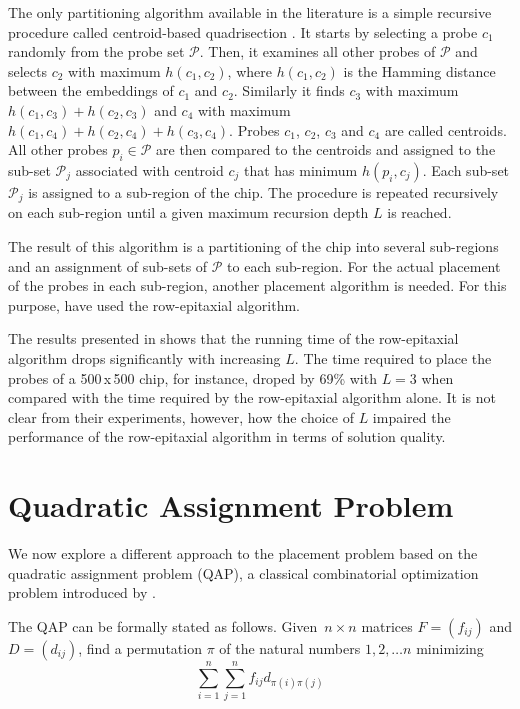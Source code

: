 \documentclass{bioinfo}
\begin{document}
The only partitioning algorithm available in the literature is a simple recursive procedure called centroid-based quadrisection \citep{KAHNG03_1}. It starts by selecting a probe $c_1$ randomly from the probe set $\mathcal{P}$. Then, it examines all other probes of $\mathcal{P}$ and selects $c_2$ with maximum $h(c_1,c_2)$, where $h(c_1,c_2)$ is the Hamming distance between the embeddings of $c_1$ and $c_2$. Similarly it finds $c_3$ with maximum $h(c_1,c_3) + h(c_2,c_3)$ and $c_4$ with maximum $h(c_1,c_4) + h(c_2,c_4) + h(c_3,c_4)$. Probes $c_1$, $c_2$, $c_3$ and $c_4$ are called centroids. All other probes $p_i \in \mathcal{P}$ are then compared to the centroids and assigned to the sub-set $\mathcal{P}_j$ associated with centroid $c_j$ that has minimum $h(p_i,c_j)$. Each sub-set $\mathcal{P}_j$ is assigned to a sub-region of the chip. The procedure is repeated recursively on each sub-region until a given maximum recursion depth $L$ is reached.

The result of this algorithm is a partitioning of the chip into several sub-regions and an assignment of sub-sets of $\mathcal{P}$ to each sub-region. For the actual placement of the probes in each sub-region, another placement algorithm is needed. For this purpose, \citealp{KAHNG03_1} have used the row-epitaxial algorithm.

The results presented in \citealp{KAHNG03_1} shows that the running time of the row-epitaxial algorithm drops significantly with increasing $L$. The time required to place the probes of a 500\,x\,500 chip, for instance, droped by 69\% with $L = 3$ when compared with the time required by the row-epitaxial algorithm alone. It is not clear from their experiments, however, how the choice of $L$ impaired the performance of the row-epitaxial algorithm in terms of solution quality.

\section{Quadratic Assignment Problem}
\label{sec:qap}

We now explore a different approach to the placement problem based on the quadratic assignment problem (QAP), a classical combinatorial optimization problem introduced by \citealp{KOOPMANS57}.

The QAP can be formally stated as follows. Given~$n \times n$ matrices $F = (f_{ij})$ and $D = (d_{ij})$, find a permutation $\pi$ of the natural numbers $1, 2, \ldots n$ minimizing
\begin{equation}
\label{eq:qap_def}
\sum_{i=1}^{n} \sum_{j=1}^{n} f_{ij} d_{\pi(i)\pi(j)}
\end{equation}
\end{document}
